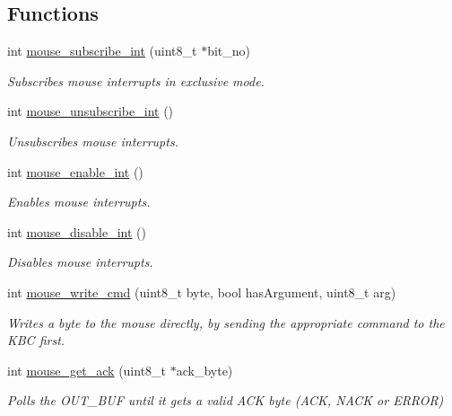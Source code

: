 \subsection*{Functions}
\begin{DoxyCompactItemize}
\item 
int \mbox{\hyperlink{group__mouse_ga9da18257ff113b686bb826d154bfaa87}{mouse\+\_\+subscribe\+\_\+int}} (uint8\+\_\+t $\ast$bit\+\_\+no)
\begin{DoxyCompactList}\small\item\em Subscribes mouse interrupts in exclusive mode. \end{DoxyCompactList}\item 
int \mbox{\hyperlink{group__mouse_ga685ad2706aca36d9869a30a19b9f446a}{mouse\+\_\+unsubscribe\+\_\+int}} ()
\begin{DoxyCompactList}\small\item\em Unsubscribes mouse interrupts. \end{DoxyCompactList}\item 
int \mbox{\hyperlink{group__mouse_gaf19e0109275a1162be7188deb9c02b41}{mouse\+\_\+enable\+\_\+int}} ()
\begin{DoxyCompactList}\small\item\em Enables mouse interrupts. \end{DoxyCompactList}\item 
int \mbox{\hyperlink{group__mouse_ga9b5d5366f7067f50586c03e9a3f000cd}{mouse\+\_\+disable\+\_\+int}} ()
\begin{DoxyCompactList}\small\item\em Disables mouse interrupts. \end{DoxyCompactList}\item 
int \mbox{\hyperlink{group__mouse_ga14261d6dca45cb7cc9c8a786739ac5a3}{mouse\+\_\+write\+\_\+cmd}} (uint8\+\_\+t byte, bool has\+Argument, uint8\+\_\+t arg)
\begin{DoxyCompactList}\small\item\em Writes a byte to the mouse directly, by sending the appropriate command to the K\+BC first. \end{DoxyCompactList}\item 
int \mbox{\hyperlink{group__mouse_ga49c9125041daa483d30f55a8c28b41fc}{mouse\+\_\+get\+\_\+ack}} (uint8\+\_\+t $\ast$ack\+\_\+byte)
\begin{DoxyCompactList}\small\item\em Polls the O\+U\+T\+\_\+\+B\+UF until it gets a valid A\+CK byte (A\+CK, N\+A\+CK or E\+R\+R\+OR) \end{DoxyCompactList}\item 

\end{DoxyCompactItemize}
